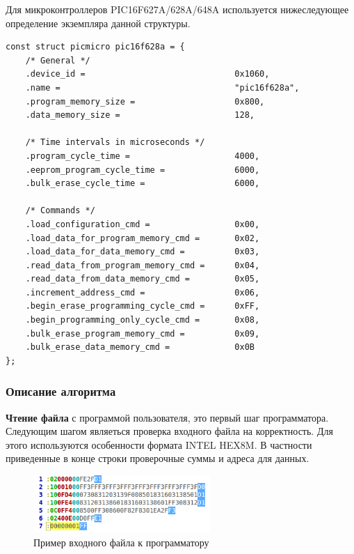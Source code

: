 Для микроконтроллеров PIC16F627A/628A/648A используется нижеследующее определение экземпляра данной структуры.
\begin{small}
\begin{verbatim}
const struct picmicro pic16f628a = {
    /* General */
    .device_id =                              0x1060,
    .name =                                   "pic16f628a",
    .program_memory_size =                    0x800,
    .data_memory_size =                       128,
    
    /* Time intervals in microseconds */
    .program_cycle_time =                     4000,
    .eeprom_program_cycle_time =              6000,
    .bulk_erase_cycle_time =                  6000,
    
    /* Commands */
    .load_configuration_cmd =                 0x00,
    .load_data_for_program_memory_cmd =       0x02,
    .load_data_for_data_memory_cmd =          0x03,
    .read_data_from_program_memory_cmd =      0x04,
    .read_data_from_data_memory_cmd =         0x05,
    .increment_address_cmd =                  0x06,
    .begin_erase_programming_cycle_cmd =      0xFF,
    .begin_programming_only_cycle_cmd =       0x08,
    .bulk_erase_program_memory_cmd =          0x09,
    .bulk_erase_data_memory_cmd =             0x0B
};
\end{verbatim}
\end{small}


\subsubsection{Описание алгоритма}

\textbf{Чтение файла} с программой пользователя, это первый шаг программатора. Следующим шагом 
являеться проверка входного файла на корректность. Для этого используются особенности формата INTEL HEX8M.
В частности приведенные в конце строки проверочные суммы и адреса для данных.

\begin{figure}[h!]
    \centering
    \includegraphics[width=0.6\textwidth]{negated_intel_hex_colored_file_example.png}
    \caption{Пример входного файла к программатору}
\end{figure}


